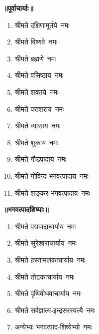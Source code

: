 \begin{center}
\label{sec:ParamparaNamavali}

\medskip
    \begin{flushleft}
\centerline{\bfseries ॥पूर्वाचार्याः॥}
\begin{enumerate}%
\item श्रीमते दक्षिणामूर्तये~नमः\\
\item श्रीमते विष्णवे~नमः\\
\item श्रीमते ब्रह्मणे~नमः\\
\item श्रीमते वसिष्ठाय~नमः\\
\item श्रीमते शक्तये~नमः\\
\item श्रीमते पराशराय~नमः\\
\item श्रीमते व्यासाय~नमः\\
\item श्रीमते शुकाय~नमः\\
\item श्रीमते गौडपादाय~नमः\\
\item श्रीमते गोविन्द-भगवत्पादाय~नमः\\
\item श्रीमते शङ्कर-भगवत्पादाय~नमः\\
\end{enumerate}

\medskip

\centerline{\bfseries ॥भगवत्पादशिष्याः॥}
\begin{enumerate}
    \item श्रीमते पद्मपादाचार्याय~नमः
    \item श्रीमते सुरेश्वराचार्याय~नमः
    \item श्रीमते हस्तामलकाचार्याय~नमः
    \item श्रीमते तोटकाचार्याय~नमः
    \item श्रीमते पृथिवीधवाचार्याय~नमः
    \item श्रीमते सर्वज्ञात्म-इन्द्रसरस्वत्यै~नमः
    \item अन्येभ्यः भगवत्पाद-शिष्येभ्यो~नमः
\end{enumerate}

\medskip


\end{flushleft}
\end{center}
